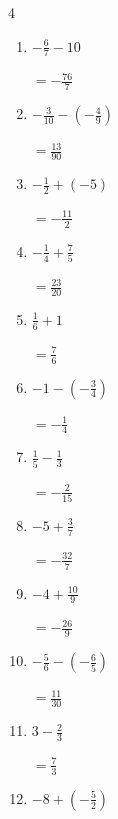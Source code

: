 \begin{multicols}{4}
\begin{enumerate}
        $\displaystyle =-\frac{25}{4}$

  \item $\displaystyle -\frac{6}{7} - 10$

        $\displaystyle =-\frac{76}{7}$

\columnbreak %

  \item $\displaystyle -\frac{3}{10} - \left(-\frac{4}{9}\right)$

        $\displaystyle =\frac{13}{90}$

  \item $\displaystyle -\frac{1}{2} + \left(-5\right)$

        $\displaystyle =-\frac{11}{2}$

  \item $\displaystyle -\frac{1}{4} + \frac{7}{5}$

        $\displaystyle =\frac{23}{20}$

  \item $\displaystyle \frac{1}{6} + 1$

        $\displaystyle =\frac{7}{6}$

  \item $\displaystyle -1 - \left(-\frac{3}{4}\right)$

        $\displaystyle =-\frac{1}{4}$

  \item $\displaystyle \frac{1}{5} - \frac{1}{3}$

        $\displaystyle =-\frac{2}{15}$

  \item $\displaystyle -5 + \frac{3}{7}$

        $\displaystyle =-\frac{32}{7}$

  \item $\displaystyle -4 + \frac{10}{9}$

        $\displaystyle =-\frac{26}{9}$

  \item $\displaystyle -\frac{5}{6} - \left(-\frac{6}{5}\right)$

        $\displaystyle =\frac{11}{30}$

  \item $\displaystyle 3 - \frac{2}{3}$

        $\displaystyle =\frac{7}{3}$

\columnbreak %

\resetques

  \item $\displaystyle -8 + \left(-\frac{5}{2}\right)$


\end{enumerate}
\end{multicols}

